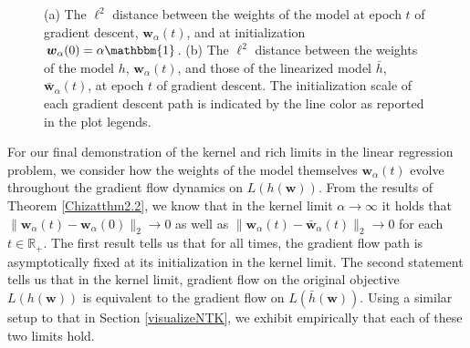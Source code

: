 \documentclass{article}
\begin{document}
\begin{figure}[H]
    \centering
    \hfill
    \caption{(a) The $\ell^2$ distance between the weights of the model at epoch $t$ of gradient descent, $\boldsymbol{w}_{\alpha}(t)$, and at initialization $\boldsymbol{w}_{\alpha}(0) = \alpha \mathbbm{1}$. (b) The $\ell^2$ distance between the weights of the model $h$, $\boldsymbol{w}_{\alpha}(t)$, and those of the linearized model $\bar{h}$, $\boldsymbol{\bar{w}}_{\alpha}(t)$, at epoch $t$ of gradient descent. The initialization scale of each gradient descent path is indicated by the line color as reported in the plot legends.}\label{fig:weights}
\end{figure}

For our final demonstration of the kernel and rich limits in the linear regression problem, we consider how the weights of the model themselves $\boldsymbol{w}_{\alpha}(t)$ evolve throughout the gradient flow dynamics on $L(h(\boldsymbol{w}))$. From the results of Theorem \ref{Chizatthm2.2}, we know that in the kernel limit $\alpha \rightarrow \infty$ it holds that $\| \boldsymbol{w}_{\alpha}(t) - \boldsymbol{w}_{\alpha}(0) \|_2 \rightarrow 0$ as well as $\| \boldsymbol{w}_{\alpha}(t) - \boldsymbol{\bar{w}}_{\alpha}(t) \|_2 \rightarrow 0$ for each $t \in \mathbb{R}_+$. The first result tells us that for all times, the gradient flow path is asymptotically fixed at its initialization in the kernel limit. The second statement tells us that in the kernel limit, gradient flow on the original objective $L(h(\boldsymbol{w}))$ is equivalent to the gradient flow on $L(\bar{h}(\boldsymbol{w}))$. Using a similar setup to that in Section \ref{visualizeNTK}, we exhibit empirically that each of these two limits hold.
\end{document}
